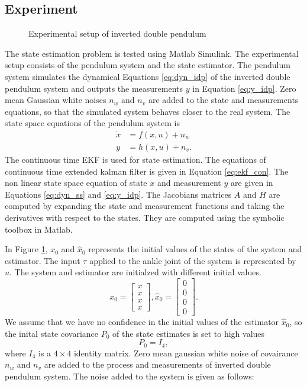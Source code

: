 \subsection{Experiment}
\begin{figure}[h]
    \centering
    
    \caption{Experimental setup of inverted double pendulum}
    \label{fig:exp_idp}  
\end{figure}

The state estimation problem is tested using Matlab Simulink. The experimental setup consists of the pendulum system and the state estimator. The pendulum system simulates the dynamical Equations \ref{eq:dyn_idp} of the inverted double pendulum system and outputs the measurements $y$ in Equation \ref{eq:y_idp}. Zero mean Gaussian white noises $n_w$ and $n_v$ are added to the state and measurements equations, so that the simulated system behaves closer to the real system. The state space equations of the pendulum system is 
\begin{equation}
    \label{eq:sim_idp}
    \begin{split}
    \dot x &= f(x,u) + n_w \\
    y &= h(x,u) + n_v.
    \end{split}
\end{equation}
The continuous time EKF is used for state estimation. The equations of continuous time extended kalman filter is given in Equation \ref{eq:ekf_con}. The non linear state space equation of state $x$ and measurement $y$ are given in Equations \ref{eq:dyn_ss} and \ref{eq:y_idp}. The Jacobians matrices $A$ and $H$ are computed by expanding the state and measurement functions and taking the derivatives with respect to the states. They are computed using the symbolic toolbox in Matlab.

In Figure \ref{fig:exp_idp}, $x_0$ and $\hat x_0$ represents the initial values of the states of the system and estimator. The input $\tau$ applied to the ankle joint of the system is represented by $u$. The system and estimator are initialzed with different initial values. $$ x_0 = \begin{bmatrix} x \\ x\\ x\\ x \end{bmatrix}, \hat x_0 = \begin{bmatrix} 0 \\ 0\\ 0\\ 0 \end{bmatrix}.$$  We assume that we have no confidence in the initial values of the estimator $\hat x_0$, so the inital state covariance $P_0$ of the state estimates is set to high values $$P_0 = I_4, $$ where $I_4$ is a $4 \times 4$ identity matrix.
Zero mean gaussian white noise of covairance $n_w$ and $n_v$ are added to the process and measurements of inverted double pendulum system. The noise added to the system is given as follows:


